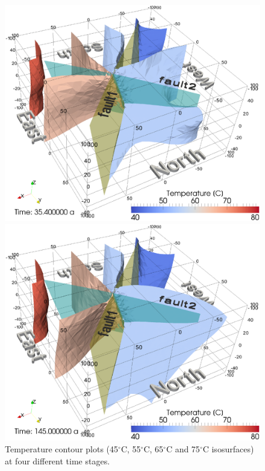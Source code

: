 \begin{figure}[htbp]
\begin{center}
        \begin{minipage}{0.37\textwidth}
            \includegraphics[width=1\textwidth]{PART_II/T/2u2f_fig5c.eps}
        \end{minipage}
        \begin{minipage}{0.37\textwidth}
            \includegraphics[width=1\textwidth]{PART_II/T/2u2f_fig5d.eps}
        \end{minipage}
        \caption{Temperature contour plots (45$^\circ{}$C, 55$^\circ{}$C, 65$^\circ{}$C and 75$^\circ{}$C isosurfaces) at four different time stages.}
        \label{fig5}
    \end{center}
\end{figure}

